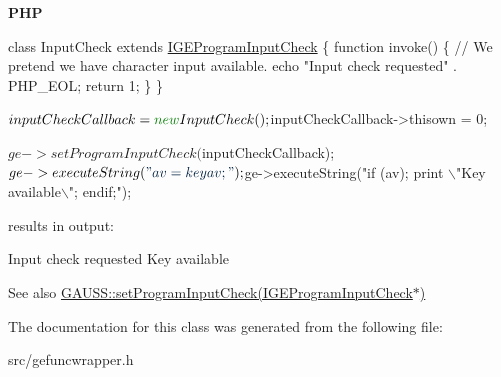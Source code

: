 {\bfseries P\+HP} 
\begin{DoxyCode}
\textcolor{keyword}{class }InputCheck \textcolor{keyword}{extends} \hyperlink{class_i_g_e_program_input_check}{IGEProgramInputCheck} \{
    \textcolor{keyword}{function} invoke() \{
        \textcolor{comment}{// We pretend we have character input available.}
        echo \textcolor{stringliteral}{"Input check requested"} . PHP\_EOL;
        \textcolor{keywordflow}{return} 1;
    \}
\}

$inputCheckCallback = \textcolor{keyword}{new} InputCheck();
$inputCheckCallback->thisown = 0;

$ge->setProgramInputCheck($inputCheckCallback);
$ge->executeString(\textcolor{stringliteral}{"av = keyav;"});
$ge->executeString(\textcolor{stringliteral}{"if (av); print \(\backslash\)"Key available\(\backslash\)"; endif;"});
\end{DoxyCode}
 results in output\+: 
\begin{DoxyCode}
Input check requested
Key available
\end{DoxyCode}


\begin{DoxySeeAlso}{See also}
\hyperlink{class_g_a_u_s_s_a6517b404cf71d157808a1cb73e3c0ddb}{G\+A\+U\+S\+S\+::set\+Program\+Input\+Check(\+I\+G\+E\+Program\+Input\+Check$\ast$)} 
\end{DoxySeeAlso}


The documentation for this class was generated from the following file\+:\begin{DoxyCompactItemize}
\item 
src/gefuncwrapper.\+h\end{DoxyCompactItemize}
